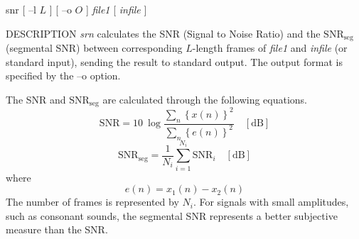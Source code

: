 \begin{synopsis}
\item [snr] [ --l $L$ ] [ --o $O$ ] {\em file1} [ {\em infile} ] 
\end{synopsis}

\begin{qsection}{DESCRIPTION}
{\em srn} calculates the SNR (Signal to Noise Ratio) 
and the $\mathrm{SNR}_{\mathrm{seg}}$ (segmental SNR) 
between corresponding $L$-length frames
of {\em file1} and {\em infile} (or standard input), 
sending the result to standard output.
The output format is specified by the --o option.

The SNR and $\mathrm{SNR}_{\mathrm{seg}}$ are calculated
through the following equations.
\begin{displaymath}
\mathrm{SNR} = 10~\log \frac{\displaystyle\sum_{n} \left\{ x(n) \right\}^{2}}
{\displaystyle\sum_{n} \left\{ e(n) \right\}^{2}} \quad \mathrm{[dB]}
\end{displaymath}
\begin{displaymath}
\mathrm{SNR}_{\mathrm{seg}} = \frac{1}{N_{i}} \sum_{i = 1}^{N_{i}}
\mathrm{SNR}_{i} \quad \mathrm{[dB]}
\end{displaymath}
where
\begin{displaymath}
e(n) = x_1(n) - x_2(n)
\end{displaymath}
The number of frames is represented by $N_i$.
For signals with small amplitudes, such as consonant sounds,
the segmental SNR represents a better subjective measure than the SNR.
\end{qsection}

\newpage
\begin{options}
\end{options}


